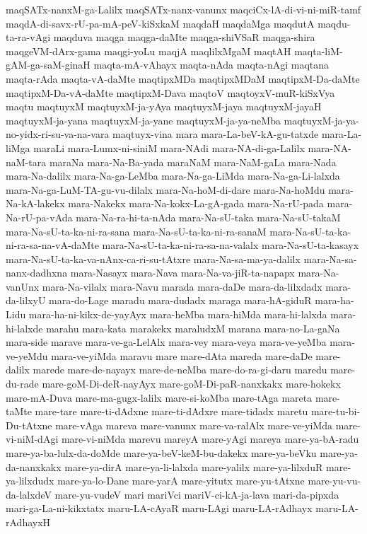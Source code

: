 {maqSATx-nanxM-ga-Lalilx
maqSATx-nanx-vanunx
maqciCx-lA-di-vi-ni-miR-tamf
maqdA-di-savx-rU-pa-mA-peV-kiSxkaM
maqdaH
maqdaMga
maqdutA
maqdu-ta-ra-vAgi
maqduva
maqga
maqga-daMte
maqga-shiVSaR
maqga-shira
maqgeVM-dArx-gama
maqgi-yoLu
maqjA
maqlilxMgaM
maqtAH
maqta-liM-gAM-ga-saM-ginaH
maqta-mA-vAhayx
maqta-nAda
maqta-nAgi
maqtana
maqta-rAda
maqta-vA-daMte
maqtipxMDa
maqtipxMDaM
maqtipxM-Da-daMte
maqtipxM-Da-vA-daMte
maqtipxM-Dava
maqtoV
maqtoyxV-muR-kiSxVya
maqtu
maqtuyxM
maqtuyxM-ja-yAya
maqtuyxM-jaya
maqtuyxM-jayaH
maqtuyxM-ja-yana
maqtuyxM-ja-yane
maqtuyxM-ja-ya-neMba
maqtuyxM-ja-ya-no-yidx-ri-su-va-na-vara
maqtuyx-vina
mara
mara-La-beV-kA-gu-tatxde
mara-La-liMga
maraLi
mara-Lumx-ni-siniM
mara-NAdi
mara-NA-di-ga-Lalilx
mara-NA-naM-tara
maraNa
mara-Na-Ba-yada
maraNaM
mara-NaM-gaLa
mara-Nada
mara-Na-dalilx
mara-Na-ga-LeMba
mara-Na-ga-LiMda
mara-Na-ga-Li-lalxda
mara-Na-ga-LuM-TA-gu-vu-dilalx
mara-Na-hoM-di-dare
mara-Na-hoMdu
mara-Na-kA-lakekx
mara-Nakekx
mara-Na-kokx-La-gA-gada
mara-Na-rU-pada
mara-Na-rU-pa-vAda
mara-Na-ra-hi-ta-nAda
mara-Na-sU-taka
mara-Na-sU-takaM
mara-Na-sU-ta-ka-ni-ra-sana
mara-Na-sU-ta-ka-ni-ra-sanaM
mara-Na-sU-ta-ka-ni-ra-sa-na-vA-daMte
mara-Na-sU-ta-ka-ni-ra-sa-na-valalx
mara-Na-sU-ta-kasayx
mara-Na-sU-ta-ka-va-nAnx-ca-ri-su-tAtxre
mara-Na-sa-ma-ya-dalilx
mara-Na-sa-nanx-dadhxna
mara-Nasayx
mara-Nava
mara-Na-va-jiR-ta-napapx
mara-Na-vanUnx
mara-Na-vilalx
mara-Navu
marada
mara-daDe
mara-da-lilxdadx
mara-da-lilxyU
mara-do-Lage
maradu
mara-dudadx
maraga
mara-hA-giduR
mara-ha-Lidu
mara-ha-ni-kikx-de-yayAyx
mara-heMba
mara-hiMda
mara-hi-lalxda
mara-hi-lalxde
marahu
mara-kata
marakekx
maraludxM
marana
mara-no-La-gaNa
mara-side
marave
mara-ve-ga-LelAlx
mara-vey
mara-veya
mara-ve-yeMba
mara-ve-yeMdu
mara-ve-yiMda
maravu
mare
mare-dAta
mareda
mare-daDe
mare-dalilx
marede
mare-de-nayayx
mare-de-neMba
mare-do-ra-gi-daru
maredu
mare-du-rade
mare-goM-Di-deR-nayAyx
mare-goM-Di-paR-nanxkakx
mare-hokekx
mare-mA-Duva
mare-ma-gugx-lalilx
mare-si-koMba
mare-tAga
mareta
mare-taMte
mare-tare
mare-ti-dAdxne
mare-ti-dAdxre
mare-tidadx
maretu
mare-tu-bi-Du-tAtxne
mare-vAga
mareva
mare-vanunx
mare-va-ralAlx
mare-ve-yiMda
mare-vi-niM-dAgi
mare-vi-niMda
marevu
mareyA
mare-yAgi
mareya
mare-ya-bA-radu
mare-ya-ba-lulx-da-doMde
mare-ya-beV-keM-bu-dakekx
mare-ya-beVku
mare-ya-da-nanxkakx
mare-ya-dirA
mare-ya-li-lalxda
mare-yalilx
mare-ya-lilxduR
mare-ya-lilxdudx
mare-ya-lo-Dane
mare-yarA
mare-yitutx
mare-yu-tAtxne
mare-yu-vu-da-lalxdeV
mare-yu-vudeV
mari
mariVci
mariV-ci-kA-ja-lava
mari-da-pipxda
mari-ga-La-ni-kikxtatx
maru-LA-cAyaR
maru-LAgi
maru-LA-rAdhayx
maru-LA-rAdhayxH
}
